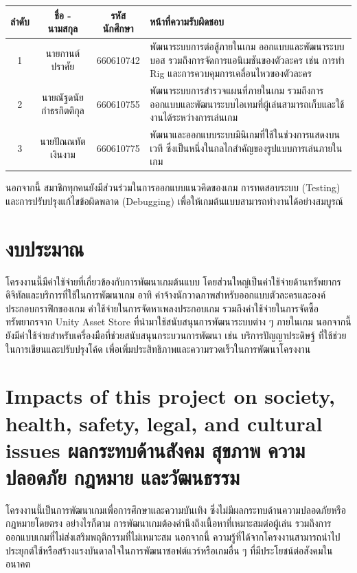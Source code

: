 \begin{center}
\begin{tabular}{|c|c|c|p{6cm}|}
\hline
ลำดับ & ชื่อ - นามสกุล & รหัสนักศึกษา & หน้าที่ความรับผิดชอบ \\
\hline
1 & นายกานต์ ปราศัย & 660610742 & พัฒนาระบบการต่อสู้ภายในเกม ออกแบบและพัฒนาระบบบอส รวมถึงการจัดการแอนิเมชันของตัวละคร เช่น การทำ Rig และการควบคุมการเคลื่อนไหวของตัวละคร \\
\hline
2 & นายณัฐดนัย กำธรกิตติกุล & 660610755 & พัฒนาระบบการสำรวจแผนที่ภายในเกม รวมถึงการออกแบบและพัฒนาระบบไอเทมที่ผู้เล่นสามารถเก็บและใช้งานได้ระหว่างการเล่นเกม \\
\hline
3 & นายปัณณทัต เงินงาม & 660610775 & พัฒนาและออกแบบระบบมินิเกมที่ใช้ในช่วงการแสดงบนเวที ซึ่งเป็นหนึ่งในกลไกสำคัญของรูปแบบการเล่นภายในเกม \\
\hline
\end{tabular}
\end{center}

นอกจากนี้ สมาชิกทุกคนยังมีส่วนร่วมในการออกแบบแนวคิดของเกม การทดสอบระบบ (Testing) และการปรับปรุงแก้ไขข้อผิดพลาด (Debugging) เพื่อให้เกมต้นแบบสามารถทำงานได้อย่างสมบูรณ์

\section{งบประมาณ}
โครงงานนี้มีค่าใช้จ่ายที่เกี่ยวข้องกับการพัฒนาเกมต้นแบบ โดยส่วนใหญ่เป็นค่าใช้จ่ายด้านทรัพยากรดิจิทัลและบริการที่ใช้ในการพัฒนาเกม อาทิ ค่าจ้างนักวาดภาพสำหรับออกแบบตัวละครและองค์ประกอบกราฟิกของเกม ค่าใช้จ่ายในการจัดหาเพลงประกอบเกม รวมถึงค่าใช้จ่ายในการจัดซื้อทรัพยากรจาก Unity Asset Store ที่นำมาใช้สนับสนุนการพัฒนาระบบต่าง ๆ ภายในเกม นอกจากนี้ยังมีค่าใช้จ่ายสำหรับเครื่องมือที่ช่วยสนับสนุนกระบวนการพัฒนา เช่น บริการปัญญาประดิษฐ์ ที่ใช้ช่วยในการเขียนและปรับปรุงโค้ด เพื่อเพิ่มประสิทธิภาพและความรวดเร็วในการพัฒนาโครงงาน

\section{\ifenglish%
Impacts of this project on society, health, safety, legal, and cultural issues
\else%
ผลกระทบด้านสังคม สุขภาพ ความปลอดภัย กฎหมาย และวัฒนธรรม
\fi}

โครงงานนี้เป็นการพัฒนาเกมเพื่อการศึกษาและความบันเทิง ซึ่งไม่มีผลกระทบด้านความปลอดภัยหรือกฎหมายโดยตรง อย่างไรก็ตาม การพัฒนาเกมต้องคำนึงถึงเนื้อหาที่เหมาะสมต่อผู้เล่น รวมถึงการออกแบบเกมที่ไม่ส่งเสริมพฤติกรรมที่ไม่เหมาะสม นอกจากนี้ ความรู้ที่ได้จากโครงงานสามารถนำไปประยุกต์ใช้หรือสร้างแรงบันดาลใจในการพัฒนาซอฟต์แวร์หรือเกมอื่น ๆ ที่มีประโยชน์ต่อสังคมในอนาคต